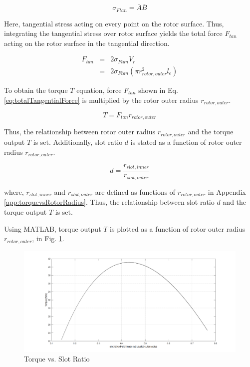 \documentclass[a4paper, 11pt, titlepage]{article}
\begin{document}
\begin{equation}
	\sigma_{Ftan}=\bar{A}\bar{B}
	\label{eq:tangentialStress}
\end{equation}

Here, tangential stress acting on every point on the rotor surface. Thus, integrating the tangential stress over rotor surface yields the total force $F_{tan}$ acting on the rotor surface in the tangential direction.

\begin{eqnarray}
	F_{tan} &=& 2\sigma_{Ftan}V_r \\
	&=& 2\sigma_{Ftan}(\pi r^2_{rotor,outer}l_e)
	\label{eq:totalTangentialForce}
\end{eqnarray}

To obtain the torque $T$ equation, force $F_{tan}$ shown in Eq. \ref{eq:totalTangentialForce} is multiplied by the rotor outer radius $r_{rotor,outer}$.

\begin{equation}
	T=F_{tan}r_{rotor,outer}
	\label{eq:torqueOutput}
\end{equation}

Thus, the relationship between rotor outer radius $r_{rotor,outer}$ and the torque output $T$ is set. Additionally, slot ratio $d$ is stated as a function of rotor outer radius $r_{rotor,outer}$.


\begin{equation}
	d = \frac{r_{slot,inner}}{r_{slot,outer}}
	\label{eq:dvsRotorRadiusOuter}
\end{equation}

where, $r_{slot,inner}$ and $r_{slot,outer}$ are defined as functions of $r_{rotor,outer}$ in Appendix \ref{app:torquevsRotorRadius}. Thus, the relationship between slot ratio $d$ and the torque output $T$ is set.

Using MATLAB, torque output $T$ is plotted as a function of rotor outer radius $r_{rotor,outer}$, in Fig. \ref{fig:TvsD}.

\begin{figure}[h]
	\includegraphics[width=\textwidth]{torquevsD_NdFeB.png}
	\caption{Torque vs. Slot Ratio}
	\label{fig:TvsD}
\end{figure}
\end{document}
